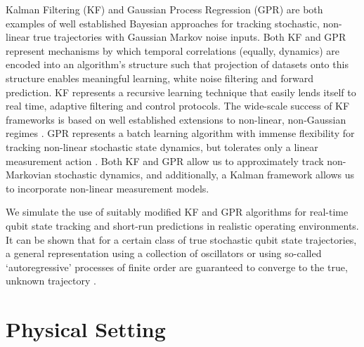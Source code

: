 \documentclass[pra, reprint]{revtex4-1}
\begin{document}
 Kalman Filtering (KF) and Gaussian Process Regression (GPR) are both examples of well established Bayesian approaches for tracking stochastic, non-linear true trajectories with Gaussian Markov noise inputs. Both KF and GPR represent mechanisms by which temporal correlations (equally, dynamics) are encoded into an algorithm's structure such that projection of datasets onto this structure enables meaningful learning, white noise filtering and forward prediction.  KF represents a recursive learning technique that easily lends itself to real time, adaptive filtering and control protocols. The wide-scale success of KF frameworks is based on well established extensions to non-linear, non-Gaussian regimes \cite{grewal2001theory}. GPR represents a batch learning algorithm with immense flexibility for tracking non-linear stochastic state dynamics, but tolerates only a linear measurement action \cite{rasmussen2005gaussian}. Both  KF and GPR allow us to approximately track non-Markovian stochastic dynamics, and additionally, a Kalman framework allows us to incorporate non-linear measurement models.

We simulate the use of suitably modified KF and GPR algorithms for real-time qubit state tracking and short-run predictions in realistic operating environments. It can be shown that for a certain class of true stochastic qubit state trajectories, a general representation using a collection of oscillators or using so-called `autoregressive' processes of finite order are guaranteed to converge to the true, unknown trajectory \cite{karlin2012first}.

\fi



\section{Physical Setting \label{sec:main:PhysicalSetting}}  
\label{sec:main:1} 
\end{document}
